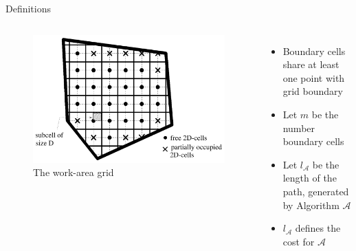 \documentclass{beamer}
\begin{document}
\begin{frame}{Definitions}
    \begin{columns}
        \begin{figure}
            \includegraphics[width=\linewidth]{Images/inv_fig1.png}
            \caption{The work-area grid}
        \end{figure}
        \begin{itemize}
            \item Boundary cells share at least one point with grid boundary
            \item Let $m$ be the number boundary cells
            \item Let $l_\mathcal{A}$ be the length of the path, generated by Algorithm $\mathcal{A}$
            \item $l_\mathcal{A}$ defines the cost for $\mathcal{A}$
        \end{itemize}
    \end{columns}
\end{frame}
\end{document}
